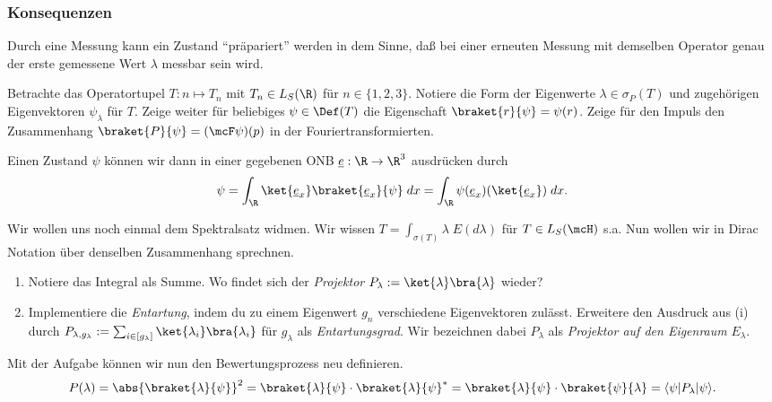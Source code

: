\documentclass{subfiles}
\begin{document}
    \subsubsection*{Konsequenzen}
        Durch eine Messung kann ein Zustand \enquote{präpariert} werden in dem Sinne, daß bei einer erneuten Messung mit demselben Operator genau der erste gemessene Wert $\lambda$ messbar sein wird. 
        \begin{Aufgabe}
            \nr{} Betrachte das Operatortupel $T:n\mapsto T_n$ mit $T_n\in L_S(\R)$ für $n\in\{1,2,3\}$. Notiere die Form der Eigenwerte $\lambda\in\sigma_P(T)$ und zugehörigen Eigenvektoren $\psi_\lambda$ für $T$. Zeige weiter für beliebiges $\psi\in\Def(T)$ die Eigenschaft $\braket{r}{\psi} = \psi(r)$. Zeige für den Impuls den Zusammenhang $\braket{P}{\psi} = (\mcF\psi)(p)$ in der Fouriertransformierten. 
        \end{Aufgabe}
        Einen Zustand $\psi$ können wir dann in einer gegebenen ONB $\underline e:\R\to\R^3$ ausdrücken durch 
        \[
            \psi = \int_{\R} \ket{\underline e_x}\braket{\underline e_x}{\psi}\;dx = \int_\R\psi(\underline e_x)(\ket{\underline e_x})\;dx.
        \] 
        \begin{Aufgabe}
            \nr{} Wir wollen uns noch einmal dem Spektralsatz widmen. Wir wissen $T = \int_{\sigma(T)}\lambda\;E(d\lambda)$ für $T\in L_S(\mcH)$ s.a. Nun wollen wir in Dirac Notation über denselben Zusammenhang sprechnen. 
            \begin{enumerate}[label=(\roman*)]
                \item Notiere das Integral als Summe. Wo findet sich der \emph{Projektor} $P_\lambda := \ket{\lambda}\bra{\lambda}$ wieder?
                \item Implementiere die \emph{Entartung}, indem du zu einem Eigenwert $g_n$ verschiedene Eigenvektoren zulässt. Erweitere den Ausdruck aus (i) durch $P_{\lambda,g_\lambda} := \sum_{i\in[g_\lambda]}\ket{\lambda_i}\bra{\lambda_i}$ für $g_\lambda$ als \emph{Entartungsgrad}. Wir bezeichnen dabei $P_\lambda$ als \emph{Projektor auf den Eigenraum} $E_\lambda$. 
            \end{enumerate}
        \end{Aufgabe}
        Mit der Aufgabe können wir nun den Bewertungsprozess neu definieren. 
        \[
            P(\lambda) = \abs{\braket{\lambda}{\psi}}^2 = \braket{\lambda}{\psi}\cdot\braket{\lambda}{\psi}^* = \braket{\lambda}{\psi}\cdot\braket{\psi}{\lambda} = \langle\psi|P_\lambda|\psi\rangle.
        \]
\end{document}
